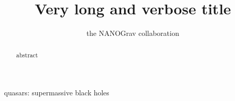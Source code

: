 %
%
%







\def\oldbibitem{} \let\oldbibitem=\bibitem
\def\bibitem{\stepcounter{citnum}\oldbibitem}

\newcommand{\orcidauthorA}{0000-0002-6625-6450} %

\title[Short Title]{Very long and verbose title}
\author[NANOGrav]{the NANOGrav collaboration}




\maketitle

\begin{abstract}
    abstract
\end{abstract}

\begin{keywords}
    quasars: supermassive black holes
\end{keywords}


